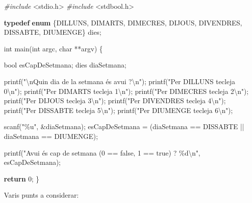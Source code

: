 \documentclass[]{book}
\newenvironment{Shaded}{\begin{snugshade}}{\end{snugshade}}
\newcommand{\ControlFlowTok}[1]{\textcolor[rgb]{0.13,0.29,0.53}{\textbf{#1}}}
\newcommand{\DataTypeTok}[1]{\textcolor[rgb]{0.13,0.29,0.53}{#1}}
\newcommand{\DecValTok}[1]{\textcolor[rgb]{0.00,0.00,0.81}{#1}}
\newcommand{\ImportTok}[1]{#1}
\newcommand{\KeywordTok}[1]{\textcolor[rgb]{0.13,0.29,0.53}{\textbf{#1}}}
\newcommand{\NormalTok}[1]{#1}
\newcommand{\PreprocessorTok}[1]{\textcolor[rgb]{0.56,0.35,0.01}{\textit{#1}}}
\newcommand{\SpecialCharTok}[1]{\textcolor[rgb]{0.00,0.00,0.00}{#1}}
\newcommand{\StringTok}[1]{\textcolor[rgb]{0.31,0.60,0.02}{#1}}
\begin{document}
\begin{Shaded}
\begin{Highlighting}[]
\PreprocessorTok{\#include }\ImportTok{\textless{}stdio.h\textgreater{}}
\PreprocessorTok{\#include }\ImportTok{\textless{}stdbool.h\textgreater{}}

\KeywordTok{typedef} \KeywordTok{enum}\NormalTok{ \{DILLUNS, DIMARTS, DIMECRES, DIJOUS, DIVENDRES, DISSABTE, DIUMENGE\} dies;}

\DataTypeTok{int}\NormalTok{ main(}\DataTypeTok{int}\NormalTok{ argc, }\DataTypeTok{char}\NormalTok{ **argv) \{}

    \DataTypeTok{bool}\NormalTok{ esCapDeSetmana;}
\NormalTok{    dies diaSetmana;}

\NormalTok{    printf(}\StringTok{"}\SpecialCharTok{\textbackslash{}n}\StringTok{Quin dia de la setmana és avui ?}\SpecialCharTok{\textbackslash{}n}\StringTok{"}\NormalTok{);}
\NormalTok{    printf(}\StringTok{"Per DILLUNS tecleja 0}\SpecialCharTok{\textbackslash{}n}\StringTok{"}\NormalTok{);}
\NormalTok{    printf(}\StringTok{"Per DIMARTS tecleja 1}\SpecialCharTok{\textbackslash{}n}\StringTok{"}\NormalTok{);}
\NormalTok{    printf(}\StringTok{"Per DIMECRES tecleja 2}\SpecialCharTok{\textbackslash{}n}\StringTok{"}\NormalTok{);}
\NormalTok{    printf(}\StringTok{"Per DIJOUS tecleja 3}\SpecialCharTok{\textbackslash{}n}\StringTok{"}\NormalTok{);}
\NormalTok{    printf(}\StringTok{"Per DIVENDRES tecleja 4}\SpecialCharTok{\textbackslash{}n}\StringTok{"}\NormalTok{);}
\NormalTok{    printf(}\StringTok{"Per DISSABTE tecleja 5}\SpecialCharTok{\textbackslash{}n}\StringTok{"}\NormalTok{);}
\NormalTok{    printf(}\StringTok{"Per DIUMENGE tecleja 6}\SpecialCharTok{\textbackslash{}n}\StringTok{"}\NormalTok{);}

\NormalTok{    scanf(}\StringTok{"\%u"}\NormalTok{, \&diaSetmana);}
\NormalTok{    esCapDeSetmana = (diaSetmana == DISSABTE || diaSetmana == DIUMENGE);}

\NormalTok{    printf(}\StringTok{"Avui és cap de setmana (0 == false, 1 == true) ? \%d}\SpecialCharTok{\textbackslash{}n}\StringTok{"}\NormalTok{, esCapDeSetmana);}

    \ControlFlowTok{return} \DecValTok{0}\NormalTok{;}
\NormalTok{\}}
\end{Highlighting}
\end{Shaded}

Varis punts a considerar:
\end{document}
